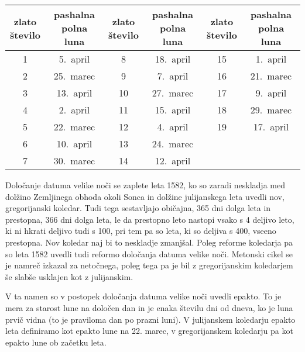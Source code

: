 \documentclass[a4paper,12pt]{article}
\begin{document}
\begin{center}
    \begin{tabular}{| c c | c c | c c |}
        \hline
        \makecell{zlato \\ število} & \makecell{pashalna \\ polna luna} & \makecell{zlato \\ število} & \makecell{pashalna \\ polna luna} & \makecell{zlato \\ število} & \makecell{pashalna \\ polna luna} \\ \hline
        1 & 5.\ april & 8 & 18.\ april & 15 & 1.\ april \\  
        2 & 25.\ marec & 9 & 7.\ april & 16 & 21.\ marec \\
        3 & 13.\ april & 10 & 27.\ marec & 17 & 9.\ april \\
        4 & 2.\ april & 11 & 15.\ april & 18 & 29.\ marec \\
        5 & 22.\ marec & 12 & 4.\ april & 19 & 17.\ april \\
        6 & 10.\ april & 13 & 24.\ marec & & \\
        7 & 30.\ marec & 14 & 12.\ april & & \\ \hline
    \end{tabular}
\end{center}

Določanje datuma velike noči se zaplete leta 1582, ko so zaradi neskladja med 
dolžino Zemljinega obhoda okoli Sonca in dolžine julijanskega leta uvedli nov, 
gregorijanski koledar. Tudi tega sestavljajo običajna, 365 dni dolga leta in 
prestopna, 366 dni dolga leta, le da prestopno leto nastopi vsako s 4 deljivo 
leto, ki ni hkrati deljivo tudi s 100, pri tem pa so leta, ki so deljiva s 400, 
vseeno prestopna. Nov koledar naj bi to neskladje zmanjšal.
Poleg reforme koledarja pa so leta 1582 uvedli tudi reformo določanja datuma 
velike noči. Metonski cikel se je namreč izkazal za netočnega, poleg tega pa 
je bil z gregorijanskim koledarjem še slabše usklajen kot z julijanskim.

V ta namen so v postopek določanja datuma velike noči uvedli epakto. To je 
mera za starost lune na določen dan in je enaka številu dni od dneva, ko je 
luna prvič vidna (to je praviloma dan po prazni luni). V julijanskem koledarju 
epakto leta definiramo kot epakto lune na 22. marec, v gregorijanskem 
koledarju pa kot epakto lune ob začetku leta.
\end{document}
